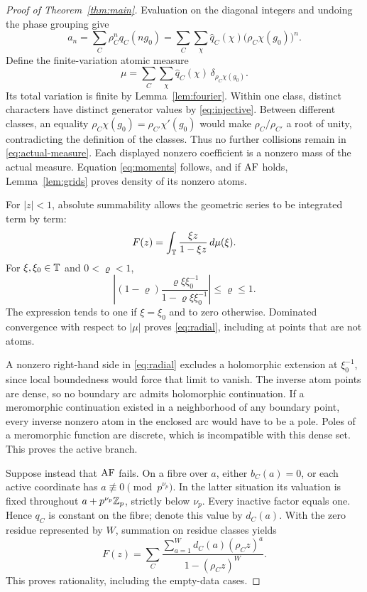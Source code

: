 \begin{proof}[Proof of Theorem~\ref{thm:main}]
Evaluation on the diagonal integers and undoing the phase grouping give
\[
a_n=\sum_C\rho_C^n q_C(ng_0)
=\sum_C\sum_\chi\widehat q_C(\chi)
       \bigl(\rho_C\chi(g_0)\bigr)^n.
\]
Define the finite-variation atomic measure
\begin{equation}\label{eq:actual-measure}
\mu=\sum_C\sum_\chi\widehat q_C(\chi)\,
\delta_{\rho_C\chi(g_0)}.
\end{equation}
Its total variation is finite by Lemma~\ref{lem:fourier}.
Within one class, distinct characters have distinct generator values
by \eqref{eq:injective}. Between different classes, an equality
\(\rho_C\chi(g_0)=\rho_{C'}\chi'(g_0)\) would make
\(\rho_C/\rho_{C'}\) a root of unity, contradicting the definition of
the classes. Thus no further collisions remain in
\eqref{eq:actual-measure}. Each displayed nonzero coefficient is a
nonzero mass of the actual measure.
Equation \eqref{eq:moments} follows, and if \(\mathrm{AF}\) holds,
Lemma~\ref{lem:grids} proves density of its nonzero atoms.

For \(|z|<1\), absolute summability allows the geometric series to be
integrated term by term:
\begin{equation}\label{eq:cauchy}
F(z)=\int_{\mathbb T}\frac{\xi z}{1-\xi z}\,d\mu(\xi).
\end{equation}
For \(\xi,\xi_0\in\mathbb T\) and \(0<\varrho<1\),
\[
\left|(1-\varrho)
\frac{\varrho\xi\xi_0^{-1}}{1-\varrho\xi\xi_0^{-1}}\right|
\leq\varrho\leq1.
\]
The expression tends to one if \(\xi=\xi_0\) and to zero otherwise.
Dominated convergence with respect to \(|\mu|\) proves
\eqref{eq:radial}, including at points that are not atoms.

A nonzero right-hand side in \eqref{eq:radial} excludes a holomorphic
extension at \(\xi_0^{-1}\), since local boundedness would force that
limit to vanish. The inverse atom points are dense, so no boundary
arc admits holomorphic continuation. If a meromorphic continuation
existed in a neighborhood of any boundary point, every inverse
nonzero atom in the enclosed arc would have to be a pole. Poles of a
meromorphic function are discrete, which is incompatible with this
dense set. This proves the active branch.

Suppose instead that \(\mathrm{AF}\) fails. On a fibre over \(a\), either
\(b_C(a)=0\), or each active coordinate has
\(a\not\equiv0\pmod{p^{\nu_p}}\). In the latter situation its valuation
is fixed throughout \(a+p^{\nu_p}\mathbb Z_p\), strictly below \(\nu_p\).
Every inactive factor equals one. Hence \(q_C\) is constant on the
fibre; denote this value by \(d_C(a)\). With the zero residue
represented by \(W\), summation on residue classes yields
\begin{equation}\label{eq:rational}
F(z)=\sum_C
\frac{\displaystyle\sum_{a=1}^{W}d_C(a)(\rho_Cz)^a}
{1-(\rho_Cz)^W}.
\end{equation}
This proves rationality, including the empty-data cases.
\end{proof}
